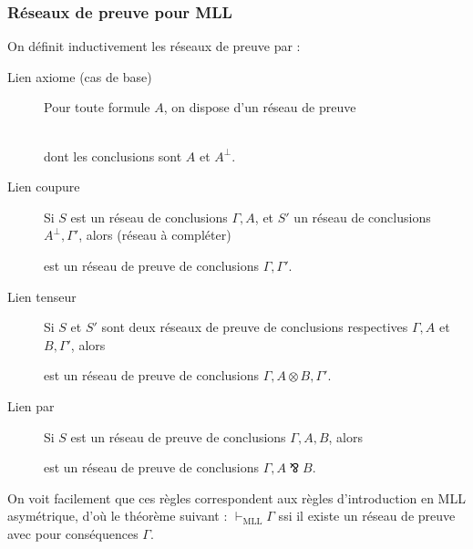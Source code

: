 \documentclass[a4paper, 11pt]{article}
\newcommand{\parr}{\mathbin{⅋}}
\begin{document}
\subsubsection{Réseaux de preuve pour MLL}

On définit inductivement les réseaux de preuve par :
\begin{description}
\item[Lien axiome (cas de base)] Pour toute formule $A$, on dispose d'un réseau de preuve
   \\
dont les conclusions sont $A$ et $A^\perp$.
\item[Lien coupure] Si $S$ est un réseau de conclusions $\Gamma, A$, et $S'$ un réseau de conclusions $A^\perp, \Gamma'$, alors (réseau à compléter)
  \begin{center}
  \end{center}
  est un réseau de preuve de conclusions $\Gamma, \Gamma'$.
\item[Lien tenseur] Si $S$ et $S'$ sont deux réseaux de preuve de conclusions respectives $\Gamma, A$ et $B, \Gamma'$, alors
  \begin{center}
    \begin{tikzpicture}
    \end{tikzpicture}
  \end{center}
  est un réseau de preuve de conclusions $\Gamma, A \otimes B, \Gamma'$.
\item[Lien par] Si $S$ est un réseau de preuve de conclusions $\Gamma, A, B$, alors
  \begin{center}
    \begin{tikzpicture}
    \end{tikzpicture}
  \end{center}
est un réseau de preuve de conclusions $\Gamma, A \parr B$.
\end{description}
On voit facilement que ces règles correspondent aux règles d'introduction en MLL asymétrique, d'où le théorème suivant : $\vdash_{\mathrm{MLL}} \Gamma$ ssi il existe un réseau de preuve avec pour conséquences $\Gamma$.
\end{document}
